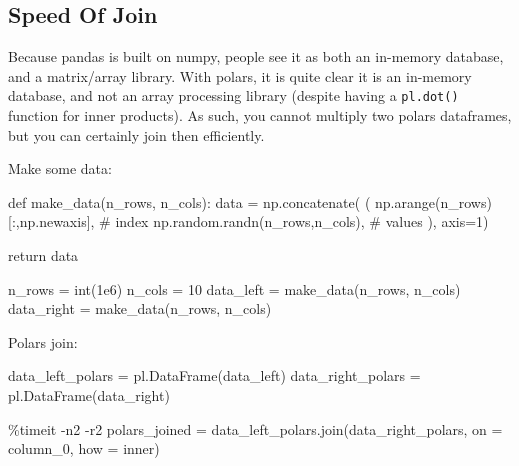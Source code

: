 \documentclass[
  letterpaper,
  DIV=11,
  numbers=noendperiod]{scrartcl}
\newenvironment{Shaded}{\begin{snugshade}}{\end{snugshade}}
\newcommand{\BuiltInTok}[1]{\textcolor[rgb]{0.00,0.23,0.31}{#1}}
\newcommand{\CommentTok}[1]{\textcolor[rgb]{0.37,0.37,0.37}{#1}}
\newcommand{\ControlFlowTok}[1]{\textcolor[rgb]{0.00,0.23,0.31}{#1}}
\newcommand{\DecValTok}[1]{\textcolor[rgb]{0.68,0.00,0.00}{#1}}
\newcommand{\FloatTok}[1]{\textcolor[rgb]{0.68,0.00,0.00}{#1}}
\newcommand{\KeywordTok}[1]{\textcolor[rgb]{0.00,0.23,0.31}{#1}}
\newcommand{\NormalTok}[1]{\textcolor[rgb]{0.00,0.23,0.31}{#1}}
\newcommand{\OperatorTok}[1]{\textcolor[rgb]{0.37,0.37,0.37}{#1}}
\newcommand{\StringTok}[1]{\textcolor[rgb]{0.13,0.47,0.30}{#1}}
\begin{document}
\hypertarget{speed-of-join}{%
\subsection{Speed Of Join}\label{speed-of-join}}

Because pandas is built on numpy, people see it as both an in-memory
database, and a matrix/array library. With polars, it is quite clear it
is an in-memory database, and not an array processing library (despite
having a \texttt{pl.dot()} function for inner products). As such, you
cannot multiply two polars dataframes, but you can certainly join then
efficiently.

Make some data:

\begin{Shaded}
\begin{Highlighting}[]
\KeywordTok{def}\NormalTok{ make\_data(n\_rows, n\_cols):}
\NormalTok{  data }\OperatorTok{=}\NormalTok{ np.concatenate(}
\NormalTok{  (}
\NormalTok{    np.arange(n\_rows)[:,np.newaxis], }\CommentTok{\# index}
\NormalTok{    np.random.randn(n\_rows,n\_cols), }\CommentTok{\# values}
\NormalTok{    ),}
\NormalTok{    axis}\OperatorTok{=}\DecValTok{1}\NormalTok{)}
    
  \ControlFlowTok{return}\NormalTok{ data}


\NormalTok{n\_rows }\OperatorTok{=} \BuiltInTok{int}\NormalTok{(}\FloatTok{1e6}\NormalTok{)}
\NormalTok{n\_cols }\OperatorTok{=} \DecValTok{10}
\NormalTok{data\_left }\OperatorTok{=}\NormalTok{ make\_data(n\_rows, n\_cols)}
\NormalTok{data\_right }\OperatorTok{=}\NormalTok{ make\_data(n\_rows, n\_cols)}
\end{Highlighting}
\end{Shaded}

Polars join:

\begin{Shaded}
\begin{Highlighting}[]
\NormalTok{data\_left\_polars }\OperatorTok{=}\NormalTok{ pl.DataFrame(data\_left)}
\NormalTok{data\_right\_polars }\OperatorTok{=}\NormalTok{ pl.DataFrame(data\_right)}

\OperatorTok{\%}\NormalTok{timeit }\OperatorTok{{-}}\NormalTok{n2 }\OperatorTok{{-}}\NormalTok{r2 polars\_joined }\OperatorTok{=}\NormalTok{ data\_left\_polars.join(data\_right\_polars, on }\OperatorTok{=} \StringTok{\textquotesingle{}column\_0\textquotesingle{}}\NormalTok{, how }\OperatorTok{=} \StringTok{\textquotesingle{}inner\textquotesingle{}}\NormalTok{)}
\end{Highlighting}
\end{Shaded}
\end{document}
